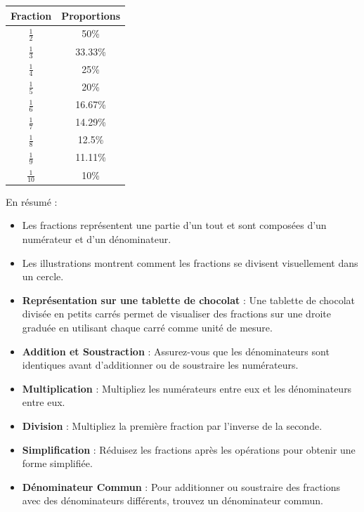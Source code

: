 \documentclass{article}
\begin{document}
\vspace{0.2cm}
\begin{tcolorbox}[colback=orange!10!white, colframe=orange!75!black, title=\textcolor{white}{Comparaison des Fractions}, sharp corners=south, boxrule=0.8mm]
    \centering
    \begin{tabular}{|c|c|}
        \hline
        \textbf{Fraction} & \textbf{Proportions} \\
        \hline
        \(\frac{1}{2}\) & 50\% \\
        \hline
        \(\frac{1}{3}\) & 33.33\% \\
        \hline
        \(\frac{1}{4}\) & 25\% \\
        \hline
        \(\frac{1}{5}\) & 20\% \\
        \hline
        \(\frac{1}{6}\) & 16.67\% \\
        \hline
        \(\frac{1}{7}\) & 14.29\% \\
        \hline
        \(\frac{1}{8}\) & 12.5\% \\
        \hline
        \(\frac{1}{9}\) & 11.11\% \\
        \hline
        \(\frac{1}{10}\) & 10\% \\
        \hline
    \end{tabular}
\end{tcolorbox}

\vspace{0.2pt}

\begin{tcolorbox}[colback=blue!10!white, colframe=cyan!75!black, title=\textcolor{white}{Récapitulatif}, sharp corners=south, boxrule=0.8mm]
    En résumé :
    \begin{itemize}
        \item Les fractions représentent une partie d'un tout et sont composées d'un numérateur et d'un dénominateur.
        \item Les illustrations montrent comment les fractions se divisent visuellement dans un cercle.
        \item \textbf{Représentation sur une tablette de chocolat} : Une tablette de chocolat divisée en petits carrés permet de visualiser des fractions sur une droite graduée en utilisant chaque carré comme unité de mesure.
        \item \textbf{Addition et Soustraction} : Assurez-vous que les dénominateurs sont identiques avant d'additionner ou de soustraire les numérateurs.
        \item \textbf{Multiplication} : Multipliez les numérateurs entre eux et les dénominateurs entre eux.
        \item \textbf{Division} : Multipliez la première fraction par l'inverse de la seconde.
        \item \textbf{Simplification} : Réduisez les fractions après les opérations pour obtenir une forme simplifiée.
        \item \textbf{Dénominateur Commun} : Pour additionner ou soustraire des fractions avec des dénominateurs différents, trouvez un dénominateur commun.     
    \end{itemize}
\end{tcolorbox}
\end{document}
